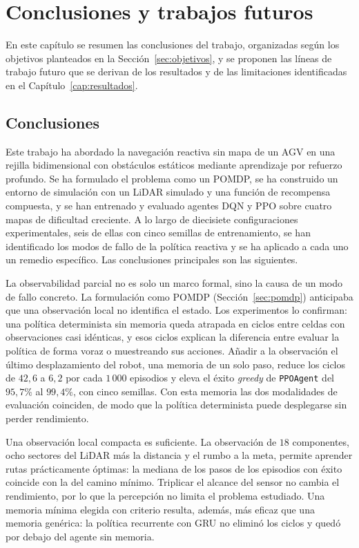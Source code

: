 \chapter{Conclusiones y trabajos futuros}\label{cap:conclusiones}

En este capítulo se resumen las conclusiones del trabajo, organizadas
según los objetivos planteados en la Sección~\ref{sec:objetivos}, y se
proponen las líneas de trabajo futuro que se derivan de los resultados y
de las limitaciones identificadas en el Capítulo~\ref{cap:resultados}.

\section{Conclusiones}\label{sec:conclusiones}
Este trabajo ha abordado la navegación reactiva sin mapa de un AGV en una
rejilla bidimensional con obstáculos estáticos mediante aprendizaje por
refuerzo profundo. Se ha formulado el problema como un POMDP, se ha
construido un entorno de simulación con un LiDAR simulado y una función
de recompensa compuesta, y se han entrenado y evaluado agentes DQN y PPO
sobre cuatro mapas de dificultad creciente. A lo largo de diecisiete
configuraciones experimentales, seis de ellas con cinco semillas de
entrenamiento, se han identificado los modos de fallo de la política
reactiva y se ha aplicado a cada uno un remedio específico. Las
conclusiones principales son las siguientes.

La observabilidad parcial no es solo un marco formal, sino la causa de
un modo de fallo concreto. La formulación como POMDP
(Sección~\ref{sec:pomdp}) anticipaba que una observación local no
identifica el estado. Los experimentos lo confirman: una política
determinista sin memoria queda atrapada en ciclos entre celdas con
observaciones casi idénticas, y esos ciclos explican la diferencia entre
evaluar la política de forma voraz o muestreando sus acciones. Añadir a
la observación el último desplazamiento del robot, una memoria de un
solo paso, reduce los ciclos de $42{,}6$ a $6{,}2$ por cada $1\,000$
episodios y eleva el éxito \textit{greedy} de \texttt{PPOAgent} del
$95{,}7\%$ al $99{,}4\%$, con cinco semillas. Con esta memoria las dos
modalidades de evaluación coinciden, de modo que la política determinista
puede desplegarse sin perder rendimiento.

Una observación local compacta es suficiente. La observación de
$18$ componentes, ocho sectores del LiDAR más la distancia y el rumbo a
la meta, permite aprender rutas prácticamente óptimas: la mediana de los
pasos de los episodios con éxito coincide con la del camino mínimo.
Triplicar el alcance del sensor no cambia el rendimiento, por lo que la
percepción no limita el problema estudiado. Una memoria mínima elegida
con criterio resulta, además, más eficaz que una memoria genérica: la
política recurrente con GRU no eliminó los ciclos y quedó por debajo del
agente sin memoria.

